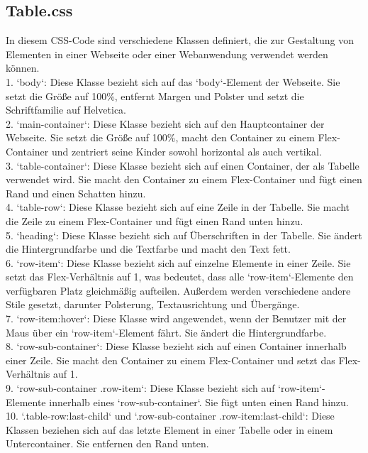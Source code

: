 \documentclass[./dokumentation.tex]{subfiles}
\begin{document}
\subsection{Table.css}
In diesem CSS-Code sind verschiedene Klassen definiert, die zur Gestaltung von Elementen in einer Webseite oder einer Webanwendung verwendet werden können.\\
1. `body`: Diese Klasse bezieht sich auf das `body`-Element der Webseite. Sie setzt die Größe auf 100\%, entfernt Margen und Polster und setzt die Schriftfamilie auf Helvetica.\\
2. `main-container`: Diese Klasse bezieht sich auf den Hauptcontainer der Webseite. Sie setzt die Größe auf 100\%, macht den Container zu einem Flex-Container und zentriert seine Kinder sowohl horizontal als auch vertikal.\\
3. `table-container`: Diese Klasse bezieht sich auf einen Container, der als Tabelle verwendet wird. Sie macht den Container zu einem Flex-Container und fügt einen Rand und einen Schatten hinzu.\\
4. `table-row`: Diese Klasse bezieht sich auf eine Zeile in der Tabelle. Sie macht die Zeile zu einem Flex-Container und fügt einen Rand unten hinzu.\\
5. `heading`: Diese Klasse bezieht sich auf Überschriften in der Tabelle. Sie ändert die Hintergrundfarbe und die Textfarbe und macht den Text fett.\\
6. `row-item`: Diese Klasse bezieht sich auf einzelne Elemente in einer Zeile. Sie setzt das Flex-Verhältnis auf 1, was bedeutet, dass alle `row-item`-Elemente den verfügbaren Platz gleichmäßig aufteilen. Außerdem werden verschiedene andere Stile gesetzt, darunter Polsterung, Textausrichtung und Übergänge.\\
7. `row-item:hover`: Diese Klasse wird angewendet, wenn der Benutzer mit der Maus über ein `row-item`-Element fährt. Sie ändert die Hintergrundfarbe.\\
8. `row-sub-container`: Diese Klasse bezieht sich auf einen Container innerhalb einer Zeile. Sie macht den Container zu einem Flex-Container und setzt das Flex-Verhältnis auf 1.\\
9. `row-sub-container .row-item`: Diese Klasse bezieht sich auf `row-item`-Elemente innerhalb eines `row-sub-container`. Sie fügt unten einen Rand hinzu.\\
10. `.table-row:last-child` und `.row-sub-container .row-item:last-child`: Diese Klassen beziehen sich auf das letzte Element in einer Tabelle oder in einem Untercontainer. Sie entfernen den Rand unten.
\end{document}
